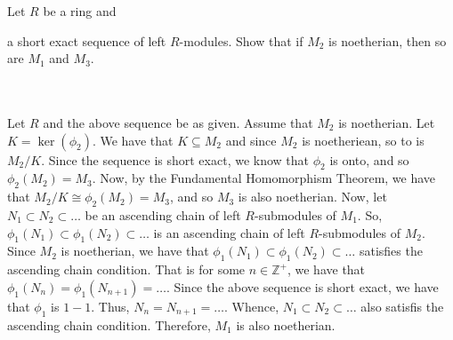 Let $R$ be a ring and

\begin{center}
\end{center} 

a short exact sequence of left $R$-modules. Show that if $M_2$ is noetherian, then so are $M_1$ and
$M_3$.\\\\

\begin{solution}\renewcommand{\qedsymbol}{}\ \\
    Let $R$ and the above sequence be as given. Assume that $M_2$ is noetherian. Let $K=\ker(\phi_2)$.
    We have that $K\subseteq M_2$ and since $M_2$ is noetheriean, so to is $M_2/K$. Since the sequence
    is short exact, we know that $\phi_2$ is onto, and so $\phi_2(M_2)=M_3$. Now, by the Fundamental
    Homomorphism Theorem, we have that $M_2/K\cong\phi_2(M_2)=M_3$, and so $M_3$ is also noetherian.
    Now, let $N_1\subset N_2\subset\ldots$ be an ascending chain of left $R$-submodules of $M_1$. So,
    $\phi_1(N_1)\subset\phi_1(N_2)\subset\ldots$ is an ascending chain of left $R$-submodules of $M_2$.
    Since $M_2$ is noetherian, we have that $\phi_1(N_1)\subset\phi_1(N_2)\subset\ldots$ satisfies the
    ascending chain condition. That is for some $n\in\mathbb{Z}^+$, we have that
    $\phi_1(N_n)=\phi_1(N_{n+1})=\ldots$. Since the above sequence is short exact, we have that
    $\phi_1$ is $1-1$. Thus, $N_n=N_{n+1}=\ldots$. Whence, $N_1\subset N_2\subset\ldots$ also satisfis
    the ascending chain condition. Therefore, $M_1$ is also noetherian.

\end{solution}